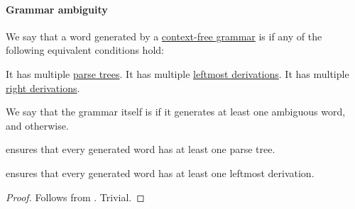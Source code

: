 \paragraph{Grammar ambiguity}

\begin{definition}\label{def:grammar_ambiguity}
  We say that a word generated by a \hyperref[def:chomsky_hierarchy/context_free]{context-free grammar} is  if any of the following equivalent conditions hold:
  \begin{thmenum}
     It has multiple \hyperref[def:parse_tree]{parse trees}.
     It has multiple \hyperref[def:leftmost_derivation]{leftmost derivations}.
     It has multiple \hyperref[def:leftmost_derivation]{right derivations}.
  \end{thmenum}

  We say that the grammar itself is  if it generates at least one ambiguous word, and  otherwise.
\end{definition}
\begin{comments}
  \item {} ensures that every generated word has at least one parse tree.
  \item {} ensures that every generated word has at least one leftmost derivation.
\end{comments}
\begin{proof}
   Follows from .
   Trivial.
\end{proof}

